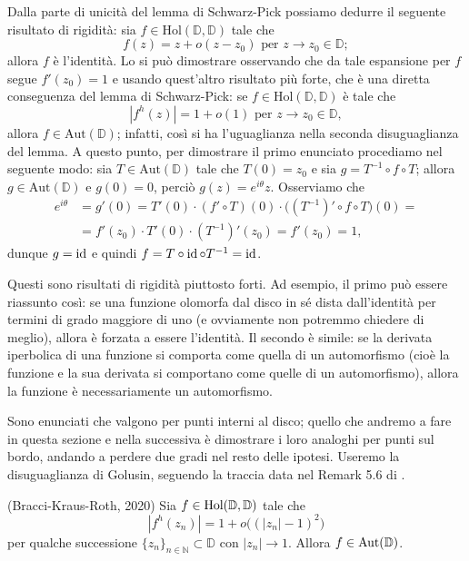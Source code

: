 Dalla parte di unicità del lemma di Schwarz-Pick possiamo dedurre il seguente risultato di rigidità: sia $f \in \text{Hol}(\mathbb{D},\mathbb{D})$ tale che
$$f(z)=z+o(z-z_0) \text{ per } z \longrightarrow z_0 \in \mathbb{D};$$
allora $f$ è l'identità. Lo si può dimostrare osservando che da tale espansione per $f$ segue $f'(z_0)=1$ e usando quest'altro risultato più forte, che è una diretta conseguenza del lemma di Schwarz-Pick: se $f \in \text{Hol}(\mathbb{D},\mathbb{D})$ è tale che
$$|f^h(z)|=1+o(1) \text{ per } z \longrightarrow z_0 \in \mathbb{D},$$
allora $f \in \text{Aut}(\mathbb{D})$; infatti, così si ha l'uguaglianza nella seconda disuguaglianza del lemma. A questo punto, per dimostrare il primo enunciato procediamo nel seguente modo: sia $T \in \text{Aut}(\mathbb{D})$ tale che $T(0)=z_0$ e sia $g=T^{-1}\circ f\circ T$; allora $g \in \text{Aut}(\mathbb{D})$ e $g(0)=0$, perciò $g(z)=e^{i\theta}z$. Osserviamo che
\begin{align*}
  e^{i\theta}&=g'(0)=T'(0)\cdot(f'\circ T)(0)\cdot\bigl((T^{-1})'\circ f\circ T\bigr)(0)= \\
  &=f'(z_0)\cdot T'(0)\cdot(T^{-1})'(z_0)=f'(z_0)=1,
\end{align*}
dunque $g=\operatorname{id}$ e quindi $f=T\circ \operatorname{id} \circ T^{-1}=\operatorname{id}$.

Questi sono risultati di rigidità piuttosto forti. Ad esempio, il primo può essere riassunto così: se una funzione olomorfa dal disco in sé dista dall'identità per termini di grado maggiore di uno (e ovviamente non potremmo chiedere di meglio), allora è forzata a essere l'identità. Il secondo è simile: se la derivata iperbolica di una funzione si comporta come quella di un automorfismo (cioè la funzione e la sua derivata si comportano come quelle di un automorfismo), allora la funzione è necessariamente un automorfismo.

Sono enunciati che valgono per punti interni al disco; quello che andremo a fare in questa sezione e nella successiva è dimostrare i loro analoghi per punti sul bordo, andando a perdere due gradi nel resto delle ipotesi. Useremo la disuguaglianza di Golusin, seguendo la traccia data nel Remark 5.6 di \cite{BKR}.

\begin{thm} \label{boundary_schwarz_pick}
  (Bracci-Kraus-Roth, 2020) Sia $f \in \text{\normalfont{Hol}}(\mathbb{D},\mathbb{D})$ tale che
  \begin{equation} \label{n_o^2}
    |f^h(z_n)|=1+o\bigl((|z_n|-1)^2\bigr)
  \end{equation}
  per qualche successione $\{z_n\}_{n \in \mathbb{N}} \subset \mathbb{D}$ con $|z_n| \longrightarrow 1$. Allora $f \in \text{\normalfont{Aut}}(\mathbb{D})$.
\end{thm}

